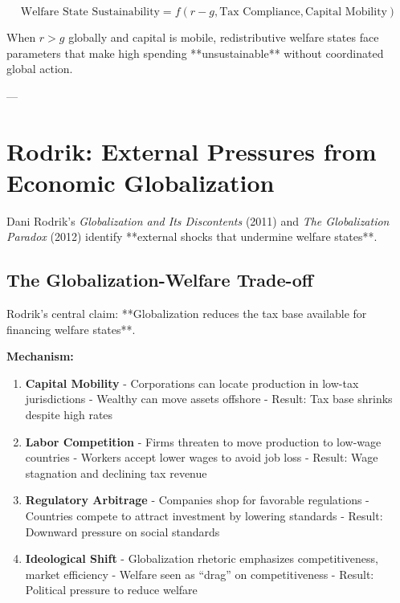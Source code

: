 \begin{equation}
\text{Welfare State Sustainability} = f(r - g, \text{Tax Compliance}, \text{Capital Mobility})
\end{equation}

When $r > g$ globally and capital is mobile, redistributive welfare states face parameters that make high spending **unsustainable** without coordinated global action.

---

\clearpage


\section{Rodrik: External Pressures from Economic Globalization}
\label{sec:rodrik}

Dani Rodrik's \emph{Globalization and Its Discontents} (2011) and \emph{The Globalization Paradox} (2012) identify **external shocks that undermine welfare states**.

\subsection{The Globalization-Welfare Trade-off}

Rodrik's central claim: **Globalization reduces the tax base available for financing welfare states**.

\textbf{Mechanism:}

\begin{enumerate}

\item \textbf{Capital Mobility}
   - Corporations can locate production in low-tax jurisdictions
   - Wealthy can move assets offshore
   - Result: Tax base shrinks despite high rates

\item \textbf{Labor Competition}
   - Firms threaten to move production to low-wage countries
   - Workers accept lower wages to avoid job loss
   - Result: Wage stagnation and declining tax revenue

\item \textbf{Regulatory Arbitrage}
   - Companies shop for favorable regulations
   - Countries compete to attract investment by lowering standards
   - Result: Downward pressure on social standards

\item \textbf{Ideological Shift}
   - Globalization rhetoric emphasizes competitiveness, market efficiency
   - Welfare seen as ``drag'' on competitiveness
   - Result: Political pressure to reduce welfare

\end{enumerate}

